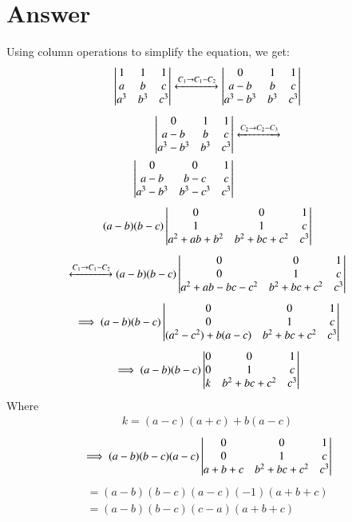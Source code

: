 \documentclass[journal,11pt,twocolumn]{IEEEtran}
\begin{document}
\section{Answer}
Using column operations to simplify the equation, we get:
\begin{align}
\begin{vmatrix}1 & 1 & 1\\a & b & c\\a^3 & b^3 & c^3\end{vmatrix} \xleftrightarrow[]{C_1\rightarrow C_1-C_2} 
\begin{vmatrix}0 & 1 & 1\\a-b & b & c\\a^3-b^3 & b^3 & c^3\end{vmatrix}
\end{align}
\begin{align}
\begin{vmatrix}0 & 1 & 1\\a-b & b & c\\a^3-b^3 & b^3 & c^3\end{vmatrix} &\xleftrightarrow[]{C_2\rightarrow C_2-C_3} \notag
\\ \begin{vmatrix}0 & 0 & 1\\a-b & b-c & c\\a^3 - b^3 & b^3 - c^3 & c^3\end{vmatrix}
\end{align}
\begin{align}
(a-b)(b-c)\begin{vmatrix}0 & 0 & 1\\1 & 1 & c\\a^2+ab+b^2 & b^2+bc+c^2 & c^3\end{vmatrix}
\end{align}
\begin{align}
 \xleftrightarrow[]{C_1\rightarrow C_1-C_2}(a-b)(b-c)
 \begin{vmatrix}0 & 0 & 1\\0 & 1 & c\\a^2+ab-bc-c^2 & b^2+bc+c^2 & c^3\end{vmatrix}
\end{align}
\begin{align}
\implies (a-b)(b-c)\begin{vmatrix}0 & 0 & 1\\0 & 1 & c\\(a^2-c^2)+b(a-c)& b^2+bc+c^2 & c^3\end{vmatrix}
\end{align}
\begin{align}
\implies (a-b)(b-c)
\begin{vmatrix}0 & 0 & 1\\0 & 1 & c\\k & b^2+bc+c^2 & c^3\end{vmatrix}
\end{align}
Where 
\begin{align}
k = (a-c)(a+c)+b(a-c)
\end{align}
\begin{align}
\implies (a-b)(b-c)(a-c) \begin{vmatrix}0 & 0 & 1\\0 & 1 & c\\a+b+c & b^2+bc+c^2 & c^3\end{vmatrix}
\end{align}
\begin{align}
=(a-b)(b-c)(a-c)(-1)(a+b+c)\\=(a-b)(b-c)(c-a)(a+b+c)
\end{align}
\end{document}
